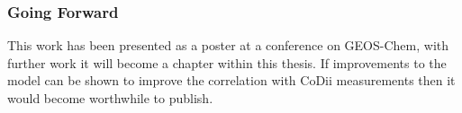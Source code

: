 \subsubsection{Going Forward}

This work has been presented as a poster at a conference on GEOS-Chem, with further work it will become a chapter within this thesis.
If improvements to the model can be shown to improve the correlation with CoDii measurements then it would become worthwhile to publish.